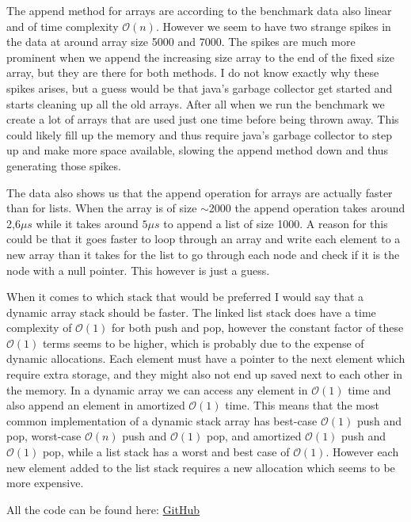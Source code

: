 \documentclass[a4paper,11pt]{article}
\begin{document}
The append method for arrays are according to the benchmark data also linear and of time
complexity $\mathcal{O}(n)$. However we seem to have two strange spikes in the data at around
array size 5000 and 7000. The spikes are much more prominent when we append the increasing size
array to the end of the fixed size array, but they are there for both methods. I do not
know exactly why these spikes arises, but a guess would be that java's garbage collector get
started and starts cleaning up all the old arrays. After all when we run the benchmark we
create a lot of arrays that are used just one time before being thrown away. This could likely
fill up the memory and thus require java's garbage collector to step up and make more space
available, slowing the append method down and thus generating those spikes.

The data also shows us that the append operation for arrays are actually faster than for
lists. When the array is of size $\sim$2000 the append operation takes around 2,6$\mu s$
while it takes around $5\mu s$ to append a list of size 1000. A reason for this could
be that it goes faster to loop through an array and write each element to a new array
than it takes for the list to go through each node and check if it is the node with a null
pointer. This however is just a guess.

When it comes to which stack that would be preferred I would say that a dynamic
array stack should be faster. The linked list stack does have a time complexity of
$\mathcal{O}(1)$ for both push and pop, however the constant factor of these $\mathcal{O}(1)$
terms seems to be higher, which is probably due to the expense of dynamic allocations.
Each element must have a pointer to the next element which require extra storage, and
they might also not end up saved next to each other in the memory. In a dynamic
array we can access any element in $\mathcal{O}(1)$ time and also append an element in
amortized $\mathcal{O}(1)$ time. This means that the most common implementation of a
dynamic stack array has best-case $\mathcal{O}(1)$ push and pop,
worst-case $\mathcal{O}(n)$ push and $\mathcal{O}(1)$ pop, and amortized $\mathcal{O}(1)$ push
and $\mathcal{O}(1)$ pop, while a list stack has a worst and best case of $\mathcal{O}(1)$.
However each new element added to the list stack requires a new allocation which seems
to be more expensive.

All the code can be found here: \href{https://github.com/adrian-jonsson-sjoedin/ID1021-AlgoData/tree/main/Tasks/LinkedLists/src}{GitHub}
\end{document}
